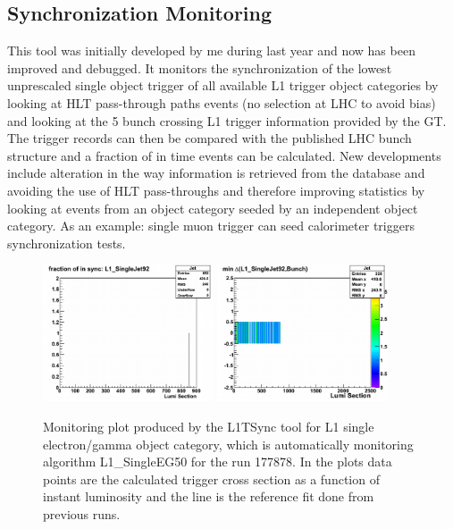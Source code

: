 \subsection{Synchronization Monitoring}

This tool was initially developed by me during last year and now has been improved and debugged. It monitors
the synchronization of the lowest unprescaled single object trigger of all available L1 trigger object categories
by looking at \gls{HLT} pass-through paths events (no selection at \gls{LHC} to avoid bias) and looking at the 5 bunch crossing
L1 trigger information provided by the GT. The trigger records can then be compared with the published LHC bunch
structure and a fraction of in time events can be calculated. New developments include alteration in the way
information is retrieved from the database and avoiding the use of \gls{HLT} pass-throughs and therefore improving statistics
by looking at events from an object category seeded by an independent object category. As an example: single muon
trigger can seed calorimeter triggers synchronization tests.

\begin{figure}[!htb]
\centering
\includegraphics[width=0.45\textwidth]{Chapter03/L1TOnline/Images/Run177878_Jet_SynchronizationCertification.png}
\includegraphics[width=0.45\textwidth]{Chapter03/L1TOnline/Images/Run177878_Jet_SynchronizationTest.png}
\caption{Monitoring plot produced by the L1TSync tool for L1 single electron/gamma object category, which is
automatically monitoring algorithm L1\_SingleEG50 for the run 177878. In the plots data points are the calculated
trigger cross section as a function of instant luminosity and the line is the reference fit done from previous runs.}
\label{figure_ServiceWork_L1TSync}
\end{figure}

